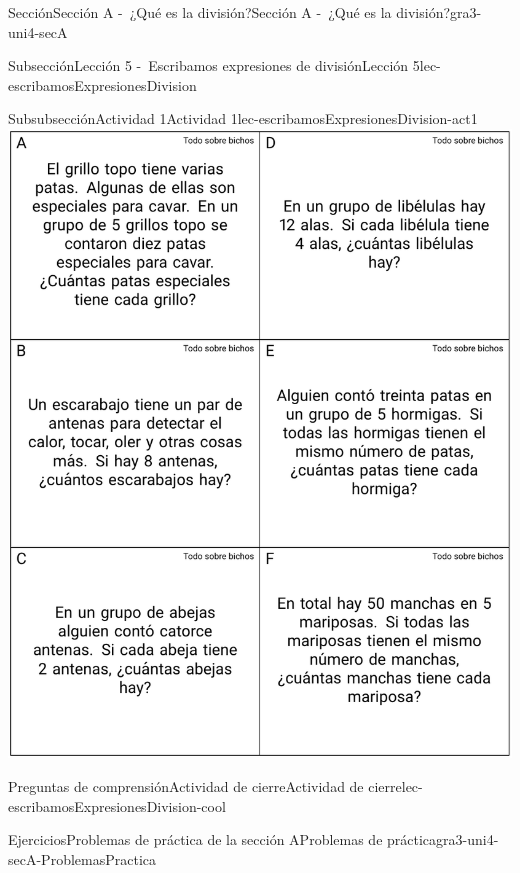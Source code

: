 \begin{sectionptx}{Sección}{Sección A -~¿Qué es la división?}{}{Sección A -~¿Qué es la división?}{}{}{gra3-uni4-secA}
\begin{subsectionptx}{Subsección}{Lección 5 -~Escribamos expresiones de división}{}{Lección 5}{}{}{lec-escribamosExpresionesDivision}
\begin{cutoutpage}
\begin{subsubsectionptx}{Subsubsección}{Actividad 1}{}{Actividad 1}{}{}{lec-escribamosExpresionesDivision-act1}
\includegraphics[max width=\linewidth, center]{external/tikz-source/todoSobreBichos-tarjetas.pdf}
\end{subsubsectionptx}
\end{cutoutpage}
%
%
\typeout{************************************************}
\typeout{************************************************}
%
\begin{reading-questions-subsubsection}{Preguntas de comprensión}{Actividad de cierre}{}{Actividad de cierre}{}{}{lec-escribamosExpresionesDivision-cool}
%
\end{reading-questions-subsubsection}
\end{subsectionptx}
%
%
\typeout{************************************************}
\typeout{************************************************}
%
\begin{exercises-subsection}{Ejercicios}{Problemas de práctica de la sección A}{}{Problemas de práctica}{}{}{gra3-uni4-secA-ProblemasPractica}
%
%
%
%
%
%
%
%
%
%
%
%
\end{exercises-subsection}
\end{sectionptx}
